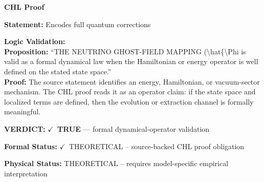 \vspace{0.45em}
\noindent\textbf{CHL Proof}\par
\textbf{Statement:} Encodes full quantum corrections

\textbf{Logic Validation:}\\
\textbf{Proposition:} ``THE NEUTRINO GHOST-FIELD MAPPING (\textbackslash{}hat\{\textbackslash{}Phi is valid as a formal dynamical law when the
Hamiltonian or energy operator is well defined on the stated state space.''\\
\textbf{Proof:} The source statement identifies an energy, Hamiltonian, or vacuum-sector mechanism. The
CHL proof reads it as an operator claim: if the state space and localized terms are
defined, then the evolution or extraction channel is formally meaningful.

\textbf{VERDICT:} \ensuremath{\checkmark}\ \textbf{TRUE} --- formal dynamical-operator validation

\textbf{Formal Status:} \ensuremath{\checkmark}\ THEORETICAL -- source-backed CHL proof obligation

\textbf{Physical Status:} THEORETICAL -- requires model-specific empirical interpretation
\par\vspace{0.45em}
\par
\ifTZPDarkEdition
{}
\fi
\endgroup
\endgroup

